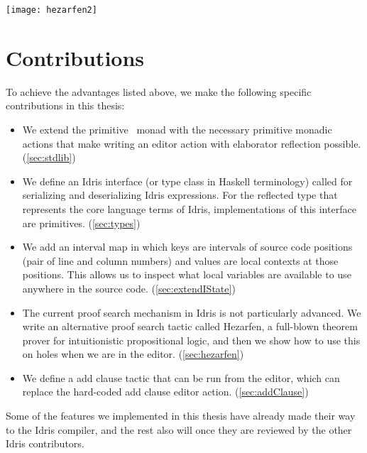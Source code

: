 \vspace{1em}
\texttt{[image: hezarfen2]}

\section{Contributions}

To achieve the advantages listed above, we make the following specific
contributions in this thesis:
\begin{itemize}
\item We extend the primitive \Elab\ monad with the necessary primitive monadic
actions that make writing an editor action with elaborator reflection possible.
(\autoref{sec:stdlib})
\item We define an Idris interface (or type class in Haskell terminology)
called  for serializing and deserializing Idris expressions.
For the reflected type that represents the core language terms of Idris,
implementations of this interface are primitives. (\autoref{sec:types})
\item We add an interval map in which keys are intervals of source code
positions (pair of line and column numbers) and values are local contexts at
those positions. This allows us to inspect what local variables are available to
use anywhere in the source code. (\autoref{sec:extendIState})
\item The current proof search mechanism in Idris is not particularly advanced.
We write an alternative proof search tactic called Hezarfen, a full-blown
theorem prover for intuitionistic propositional logic, and then we show how
to use this on holes when we are in the editor.  (\autoref{sec:hezarfen})
\item We define a add clause tactic that can be run from the editor, which can
replace the hard-coded add clause editor action.  (\autoref{sec:addClause})
\end{itemize}

Some of the features we implemented in this thesis have already made their way to
the Idris compiler, and the rest also will once they are reviewed by the
other Idris contributors.

